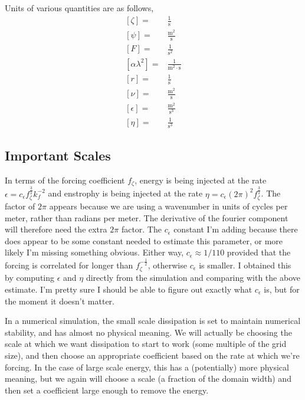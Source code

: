 \documentclass[11pt]{article}
\begin{document}
Units of various quantities are as follows,
\begin{align}
\left[ \zeta \right] =& \frac{1}{\textrm{s}} \\
\left[ \psi \right] =& \frac{\textrm{m}^2}{\textrm{s}} \\
\left[ F \right] =& \frac{1}{\textrm{s}^2} \\
\left[ \alpha \lambda^2 \right] =& \frac{1}{\textrm{m}^2\cdot\textrm{s}} \\
\left[ r \right] =& \frac{1}{\textrm{s}} \\
\left[ \nu \right] =& \frac{\textrm{m}^2}{\textrm{s}} \\
\left[ \epsilon \right] =& \frac{\textrm{m}^2}{\textrm{s}^3}\\
\left[ \eta \right] =& \frac{1}{\textrm{s}^3}
\end{align} 

%
\subsection{Important Scales}
%

In terms of the forcing coefficient $f_\zeta$, energy is being injected at the rate $\epsilon=c_\epsilon f_\zeta^{\frac{3}{2}} k_f^{-2}$ and enstrophy is being injected at the rate $\eta= c_\epsilon (2\pi)^2 f_\zeta^{\frac{3}{2}}$. The factor of $2\pi$ appears because we are using a wavenumber in units of cycles per meter, rather than radians per meter. The derivative of the fourier component will therefore need the extra $2 \pi$ factor. The $c_\epsilon$ constant I'm adding because there does appear to be some constant needed to estimate this parameter, or more likely I'm missing something obvious. Either way, $c_\epsilon\approx 1/110$ provided that the forcing is correlated for longer than $f_\zeta^{-\frac{1}{2}}$, otherwise $c_\epsilon$ is smaller. I obtained this by computing $\epsilon$ and $\eta$ directly from the simulation and comparing with the above estimate. I'm pretty sure I should be able to figure out exactly what $c_\epsilon$ is, but for the moment it doesn't matter.

In a numerical simulation, the small scale dissipation is set to maintain numerical stability, and has almost no physical meaning. We will actually be choosing the scale at which we want dissipation to start to work (some multiple of the grid size), and then choose an appropriate coefficient based on the rate at which we're forcing. In the case of large scale energy, this has a (potentially) more physical meaning, but we again will choose a scale (a fraction of the domain width) and then set a coefficient large enough to remove the energy.
\end{document}
